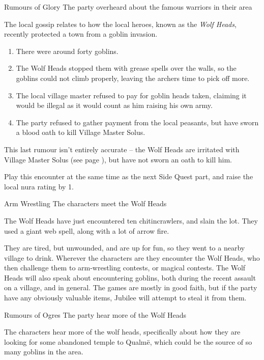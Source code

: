 \begin{multicols}{2}

{\N Rumours of Glory}%
{The party overheard about the famous warriors in their area}%

The local gossip relates to how the local heroes, known as the \textit{Wolf Heads}, recently protected a town from a goblin invasion.

\begin{enumerate}

	\item{There were around forty goblins.}
	\item{The Wolf Heads stopped them with grease spells over the walls, so the goblins could not climb properly, leaving the archers time to pick off more.}
	\item{The local village master refused to pay for goblin heads taken, claiming it would be illegal as it would count as him raising his own army.}
	\item{The party refused to gather payment from the local peasants, but have sworn a blood oath to kill Village Master Solus.}
\end{enumerate}

This last rumour isn't entirely accurate -- the Wolf Heads are irritated with Village Master Solus (see page \pageref{solus}), but have not sworn an oath to kill him.

Play this encounter at the same time as the next Side Quest part, and raise the local nura rating by 1.

{Arm Wrestling}%
{The characters meet the Wolf Heads}%

The Wolf Heads have just encountered ten chitincrawlers, and slain the lot.
They used a giant web spell, along with a lot of arrow fire.

They are tired, but unwounded, and are up for fun, so they went to a nearby village to drink.
Wherever the characters are they encounter the Wolf Heads, who then challenge them to arm-wrestling contests, or magical contests.
The Wolf Heads will also speak about encountering goblins, both during the recent assault on a village, and in general.
The games are mostly in good faith, but if the party have any obviously valuable items, Jubilee will attempt to steal it from them.

{\N Rumours of Ogres}%
{The party hear more of the Wolf Heads}%

The characters hear more of the wolf heads, specifically about how they are looking for some abandoned temple to Qualm\"e, which could be the source of so many goblins in the area.


\end{multicols}
